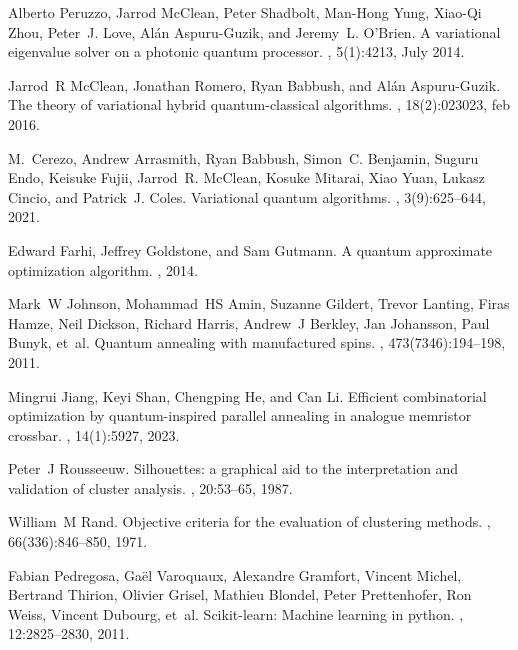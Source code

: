 \documentclass[showpacs,twocolumn,superscriptaddress]{revtex4-2}
\begin{document}
\begin{thebibliography}{10}
Alberto Peruzzo, Jarrod McClean, Peter Shadbolt, Man-Hong Yung, Xiao-Qi Zhou,
  Peter~J. Love, Alán Aspuru-Guzik, and Jeremy~L. O’Brien.
\newblock A variational eigenvalue solver on a photonic quantum processor.
, 5(1):4213, July 2014.

Jarrod~R McClean, Jonathan Romero, Ryan Babbush, and Al{\'{a}}n Aspuru-Guzik.
\newblock The theory of variational hybrid quantum-classical algorithms.
, 18(2):023023, feb 2016.

M.~Cerezo, Andrew Arrasmith, Ryan Babbush, Simon~C. Benjamin, Suguru Endo,
  Keisuke Fujii, Jarrod~R. {McClean}, Kosuke Mitarai, Xiao Yuan, Lukasz Cincio,
  and Patrick~J. Coles.
\newblock Variational quantum algorithms.
, 3(9):625--644, 2021.

Edward Farhi, Jeffrey Goldstone, and Sam Gutmann.
\newblock A quantum approximate optimization algorithm.
, 2014.

Mark~W Johnson, Mohammad~HS Amin, Suzanne Gildert, Trevor Lanting, Firas Hamze,
  Neil Dickson, Richard Harris, Andrew~J Berkley, Jan Johansson, Paul Bunyk,
  et~al.
\newblock Quantum annealing with manufactured spins.
, 473(7346):194--198, 2011.

Mingrui Jiang, Keyi Shan, Chengping He, and Can Li.
\newblock Efficient combinatorial optimization by quantum-inspired parallel
  annealing in analogue memristor crossbar.
, 14(1):5927, 2023.

Peter~J Rousseeuw.
\newblock Silhouettes: a graphical aid to the interpretation and validation of
  cluster analysis.
, 20:53--65,
  1987.

William~M Rand.
\newblock Objective criteria for the evaluation of clustering methods.
,
  66(336):846--850, 1971.

Fabian Pedregosa, Ga{\"e}l Varoquaux, Alexandre Gramfort, Vincent Michel,
  Bertrand Thirion, Olivier Grisel, Mathieu Blondel, Peter Prettenhofer, Ron
  Weiss, Vincent Dubourg, et~al.
\newblock Scikit-learn: Machine learning in python.
, 12:2825--2830, 2011.


\end{thebibliography}
\end{document}
